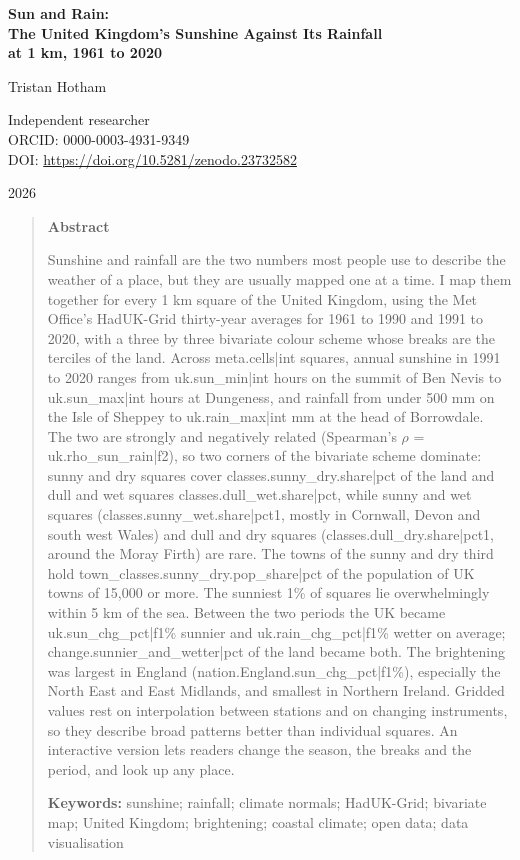 \documentclass[11pt,a4paper]{article}
\begin{document}
\begin{center}
{\Large\bfseries Sun and Rain:\\[2pt] The United Kingdom's Sunshine Against Its Rainfall\\[2pt] at 1 km, 1961 to 2020\par}
\vspace{1.2em}
{\large Tristan Hotham\par}
\vspace{0.3em}
{\small Independent researcher\\
ORCID: 0000-0003-4931-9349\\
DOI: \href{https://doi.org/10.5281/zenodo.23732582}{https://doi.org/10.5281/zenodo.23732582}\par}
\vspace{0.8em}
2026
\end{center}

\begin{quote}
\small
\begin{center}\textbf{Abstract}\end{center}
Sunshine and rainfall are the two numbers most people use to describe the weather of a place, but they are usually mapped one at a time. I map them together for every 1 km square of the United Kingdom, using the Met Office's HadUK-Grid thirty-year averages for 1961 to 1990 and 1991 to 2020, with a three by three bivariate colour scheme whose breaks are the terciles of the land. Across {{meta.cells|int}} squares, annual sunshine in 1991 to 2020 ranges from {{uk.sun_min|int}} hours on the summit of Ben Nevis to {{uk.sun_max|int}} hours at Dungeness, and rainfall from under 500 mm on the Isle of Sheppey to {{uk.rain_max|int}} mm at the head of Borrowdale. The two are strongly and negatively related (Spearman's $\rho$ = {{uk.rho_sun_rain|f2}}), so two corners of the bivariate scheme dominate: sunny and dry squares cover {{classes.sunny_dry.share|pct}} of the land and dull and wet squares {{classes.dull_wet.share|pct}}, while sunny and wet squares ({{classes.sunny_wet.share|pct1}}, mostly in Cornwall, Devon and south west Wales) and dull and dry squares ({{classes.dull_dry.share|pct1}}, around the Moray Firth) are rare. The towns of the sunny and dry third hold {{town_classes.sunny_dry.pop_share|pct}} of the population of UK towns of 15,000 or more. The sunniest 1\% of squares lie overwhelmingly within 5 km of the sea. Between the two periods the UK became {{uk.sun_chg_pct|f1}}\% sunnier and {{uk.rain_chg_pct|f1}}\% wetter on average; {{change.sunnier_and_wetter|pct}} of the land became both. The brightening was largest in England ({{nation.England.sun_chg_pct|f1}}\%), especially the North East and East Midlands, and smallest in Northern Ireland. Gridded values rest on interpolation between stations and on changing instruments, so they describe broad patterns better than individual squares. An interactive version lets readers change the season, the breaks and the period, and look up any place.

\textbf{Keywords:} sunshine; rainfall; climate normals; HadUK-Grid; bivariate map; United Kingdom; brightening; coastal climate; open data; data visualisation
\end{quote}
\end{document}
